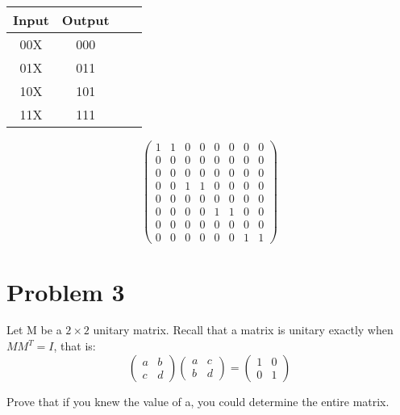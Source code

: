 \documentclass[12pt]{article}
\begin{document}
\begin{center}
\begin{tabular}{|c|c|c|c|}
\hline
Input & Output  \\
\hline
00X & 000 \\
01X & 011 \\
10X & 101 \\
11X & 111 \\
\hline
\end{tabular}
\end{center}


\begin{equation}
	\begin{pmatrix}
	1 & 1 & 0 & 0 & 0 & 0 & 0 & 0 \\
	0 & 0 & 0 & 0 & 0 & 0 & 0 & 0 \\
	0 & 0 & 0 & 0 & 0 & 0 & 0 & 0 \\
	0 & 0 & 1 & 1 & 0 & 0 & 0 & 0 \\
	0 & 0 & 0 & 0 & 0 & 0 & 0 & 0 \\
	0 & 0 & 0 & 0 & 1 & 1 & 0 & 0 \\
	0	& 0 & 0 & 0 & 0 & 0 & 0 & 0 \\
	0 & 0 & 0 & 0 & 0 & 0 & 1 & 1
	\end{pmatrix}
\end{equation}




\section*{Problem 3}


\begin{questionbox}
	Let M be a $2 \times 2$ unitary matrix. Recall that a matrix is unitary exactly
	when $MM^T = I$, that is:
	\begin{equation}
		\begin{pmatrix}
			a & b \\
			c & d
		\end{pmatrix}
		\begin{pmatrix}
			a & c \\
			b & d
		\end{pmatrix}
		=
		\begin{pmatrix}
			1 & 0 \\
			0 & 1
		\end{pmatrix}
	\end{equation}

	Prove that if you knew the value of a, you could determine the entire
	matrix.
\end{questionbox}
\end{document}
